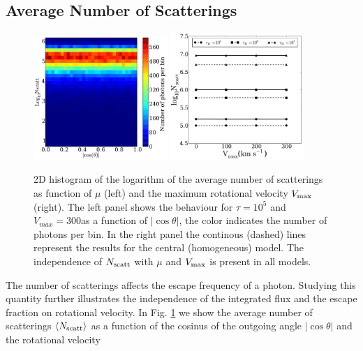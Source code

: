 \subsection{Average Number of Scatterings}
\label{sec:scatterings}
\begin{figure}
\begin{center}
\includegraphics[width=0.45\textwidth]{Figures/f12.pdf}
\includegraphics[width=0.45\textwidth]{Figures/f13.pdf}
\end{center}
\caption{2D histogram of the logarithm of the average number of scatterings as function of $\mu$ (left) and the maximum rotational velocity $V_{\rm
max}$ (right). The left panel shows the behaviour for $\tau=10^{5}$ and
$V_{max}=300$\kms as a function of $\left|\cos\theta\right|$, the color indicates the number of photons per bin. In the
right panel the continous (dashed) lines represent the results for
the central (homogeneous) model. The independence of $N_{\rm scatt}$ with $\mu$ and $V_{\rm max}$ is
present in all models.
\label{fig:Nscatt} }
\end{figure}
The number of scatterings affects the escape frequency of a \ly
photon. Studying this quantity further illustrates the independence of
the integrated flux and the escape fraction on rotational velocity.
In Fig. \ref{fig:Nscatt} we show the average number of scatterings
$\langle N_{\rm scatt}\rangle$ as a function of the cosinus of the
outgoing angle $|\cos\theta|$ and the rotational velocity
